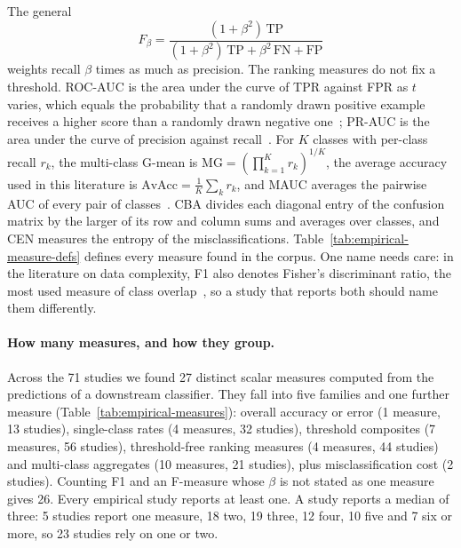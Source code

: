 The general
\[
  F_\beta = \frac{(1 + \beta^2)\,\mathrm{TP}}{(1 + \beta^2)\,\mathrm{TP} + \beta^2\,\mathrm{FN} + \mathrm{FP}}
\]
weights recall $\beta$ times as much as precision. The ranking measures do not fix a threshold. ROC-AUC is the area under the curve of TPR against FPR as $t$ varies, which equals the probability that a randomly drawn positive example receives a higher score than a randomly drawn negative one~\parencite{bradley1997use}; PR-AUC is the area under the curve of precision against recall~\parencite{saito2015precision}. For $K$ classes with per-class recall $r_k$, the multi-class G-mean is $\mathrm{MG} = (\prod_{k=1}^{K} r_k)^{1/K}$, the average accuracy used in this literature is $\mathrm{AvAcc} = \frac{1}{K}\sum_k r_k$, and MAUC averages the pairwise AUC of every pair of classes~\parencite{hand2001simple}. CBA divides each diagonal entry of the confusion matrix by the larger of its row and column sums and averages over classes, and CEN measures the entropy of the misclassifications. Table~\ref{tab:empirical-measure-defs} defines every measure found in the corpus. One name needs care: in the literature on data complexity, F1 also denotes Fisher's discriminant ratio, the most used measure of class overlap~\parencite{ho2002complexity,fernandez2018smote}, so a study that reports both should name them differently.



\paragraph{How many measures, and how they group.} Across the 71 studies we found 27 distinct scalar measures computed from the predictions of a downstream classifier. They fall into five families and one further measure (Table~\ref{tab:empirical-measures}): overall accuracy or error (1 measure, 13 studies), single-class rates (4 measures, 32 studies), threshold composites (7 measures, 56 studies), threshold-free ranking measures (4 measures, 44 studies) and multi-class aggregates (10 measures, 21 studies), plus misclassification cost (2 studies). Counting F1 and an F-measure whose $\beta$ is not stated as one measure gives 26. Every empirical study reports at least one. A study reports a median of three: 5 studies report one measure, 18 two, 19 three, 12 four, 10 five and 7 six or more, so 23 studies rely on one or two.



